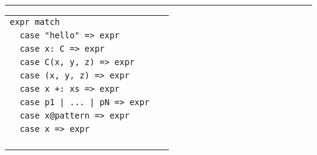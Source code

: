 \documentclass[article, a5paper]{memoir}
\newcommand{\LangColor}{scalared}
\newcommand{\head}[1]{{\bfseries {\color{\LangColor}{#1}}\par\vspace{1mm}\hrule\vspace{-2mm}}}
\renewcommand{\arraystretch}{0.9}
\newcommand{\code}{\lstinline[basicstyle=\ttfamily]}
\newcommand{\Comment}[1]{{\color{commentgreen}{#1}}}
\begin{document}
\head{Pattern matching, type tests}\vspace{0.5em}

\vspace{0.25em}\renewcommand{\arraystretch}{1.0}
{\small%
\begin{tabular}{@{}l @{\hspace{-9.1em}}r}
\code|expr match |
& \Comment{expr is matched against patterns from top until match found, yielding the expression after =>}\\

\code|  case "hello" => expr |
& \Comment{\textbf{literal pattern} matches any value equal (in terms of ==) to the literal}\\

\code|  case x: C => expr |
& \Comment{\textbf{typed variable pattern} matches all instances of C, binding variable x to the instance} \\

\code|  case C(x, y, z) => expr |
& \Comment{\textbf{constructor pattern} matches values of the form C(x, y, z), args bound to x,y,z}\\
\code|  case (x, y, z) => expr  | & \Comment{\textbf{tuple pattern} matches tuple values, alias for constructor pattern Tuple3(x, y, z)}\\

\code|  case x +: xs => expr |
& \Comment{\textbf{sequence extractor patterns} matches head and tail, also x +: y +: z +: xs etc.} \\

\code+  case p1 | ... | pN => expr +
& \Comment{\textbf{alternative pattern}, match if at least one pattern p1, ..., pN  match} \\

\code|  case x@pattern => expr |
& \Comment{a \textbf{pattern binder} with the @ sign binds a variable to (part of) a pattern} \\


\code|  case x => expr |
& \Comment{\textbf{untyped variable pattern} matches any value, typical ''catch all'' at bottom: \textbf{\texttt{case \_ =>}}} \\

\code|                         | & \Comment{Pattern matching on direct subtypes of a \textbf{sealed} class is checked for exhaustiveness by the compiler} \\
\end{tabular}
}%
\end{document}

